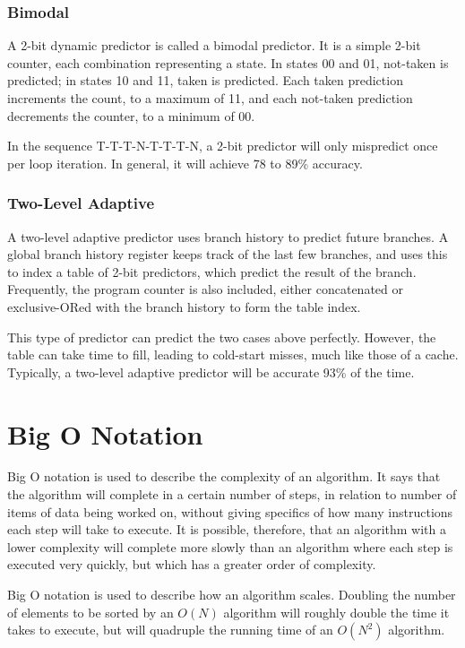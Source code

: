 \subsubsection{Bimodal}
A 2-bit dynamic predictor is called a bimodal predictor. It is a simple 2-bit
counter, each combination representing a state. In states 00 and 01, not-taken
is predicted; in states 10 and 11, taken is predicted. Each taken prediction
increments the count, to a maximum of 11, and each not-taken prediction
decrements the counter, to a minimum of 00.

In the sequence T-T-T-N-T-T-T-N, a 2-bit predictor will only mispredict once per
loop iteration. In general, it will achieve 78 to 89\% accuracy.

\subsubsection{Two-Level Adaptive}
A two-level adaptive predictor uses branch history to predict future branches. A
global branch history register keeps track of the last few branches, and uses
this to index a table of 2-bit predictors, which predict the result of the
branch. Frequently, the program counter is also included, either concatenated or
exclusive-ORed with the branch history to form the table index.

This type of predictor can predict the two cases above perfectly.  However, the
table can take time to fill, leading to cold-start misses, much like those of a
cache. Typically, a two-level adaptive predictor will be accurate 93\% of the time.

\section{Big O Notation}
Big O notation is used to describe the complexity of an algorithm. It says that
the algorithm will complete in a certain number of steps, in relation to number
of items of data being worked on, without giving specifics of how many
instructions each step will take to execute. It is possible, therefore, that an
algorithm with a lower complexity will complete more slowly than an algorithm
where each step is executed very quickly, but which has a greater order of
complexity.

Big O notation is used to describe how an algorithm scales. Doubling the number
of elements to be sorted by an $O(N)$ algorithm will roughly double the time it
takes to execute, but will quadruple the running time of an $O(N^2)$ algorithm.

